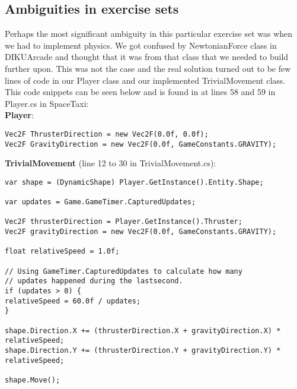\documentclass[../master.tex]{subfile}
\begin{document}
\subsection{Ambiguities in exercise sets}
Perhaps the most significant ambiguity in this particular exercise set was when we had to implement physics. We got confused by NewtonianForce class in DIKUArcade and thought that it was from that class that we needed to build further upon. This was not the case and the real solution turned out to be few lines of code in our Player class and our implemented TrivialMovement class. This code snippets can be seen below and is found in at lines 58 and 59 in Player.cs in SpaceTaxi:\\

\textbf{Player}:
\small{
\begin{lstlisting}
Vec2F ThrusterDirection = new Vec2F(0.0f, 0.0f);
Vec2F GravityDirection = new Vec2F(0.0f, GameConstants.GRAVITY);
\end{lstlisting}
}

\textbf{TrivialMovement} (line 12 to 30 in TrivialMovement.cs):
\small{
\begin{lstlisting}
var shape = (DynamicShape) Player.GetInstance().Entity.Shape;

var updates = Game.GameTimer.CapturedUpdates;

Vec2F thrusterDirection = Player.GetInstance().Thruster;
Vec2F gravityDirection = new Vec2F(0.0f, GameConstants.GRAVITY);

float relativeSpeed = 1.0f;

// Using GameTimer.CapturedUpdates to calculate how many
// updates happened during the lastsecond.
if (updates > 0) {
relativeSpeed = 60.0f / updates;
}

shape.Direction.X += (thrusterDirection.X + gravityDirection.X) * relativeSpeed;
shape.Direction.Y += (thrusterDirection.Y + gravityDirection.Y) * relativeSpeed;

shape.Move();
\end{lstlisting}
}
\end{document}

